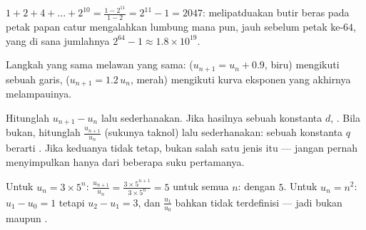 \begin{example}\label{ex:g11:seq:chessboard}
$1 + 2 + 4 + \dots + 2^{10} = \frac{1 - 2^{11}}{1 - 2} = 2^{11} - 1 =
2047$: melipatduakan butir beras pada petak papan catur mengalahkan
lumbung mana pun, jauh sebelum petak ke-$64$, yang di sana jumlahnya
$2^{64} - 1 \approx 1.8 \times 10^{19}$.
\end{example}

\begin{omfigure}

{\small Langkah yang sama melawan  yang sama: 
($u_{n+1} = u_n + 0.9$, biru) mengikuti sebuah garis, 
($u_{n+1} = 1.2\,u_n$, merah) mengikuti kurva eksponen yang akhirnya
melampauinya.}
\end{omfigure}

\begin{method}\label{met:g11:seq:recognize}
Hitunglah $u_{n+1} - u_n$ lalu sederhanakan. Jika hasilnya sebuah konstanta
$d$,  . Bila bukan, hitunglah $\frac{u_{n+1}}{u_n}$
(sukunya taknol) lalu sederhanakan: sebuah konstanta $q$ berarti .
Jika keduanya tidak tetap,  bukan salah satu jenis itu --- jangan
pernah menyimpulkan hanya dari beberapa suku pertamanya.
\end{method}

\begin{example}
Untuk $u_n = 3 \times 5^n$:
$\frac{u_{n+1}}{u_n} = \frac{3 \times 5^{n+1}}{3 \times 5^n} = 5$ untuk semua
$n$:  dengan  $5$. Untuk $u_n = n^2$:
$u_1 - u_0 = 1$ tetapi $u_2 - u_1 = 3$, dan
$\frac{u_1}{u_0}$ bahkan tidak terdefinisi --- jadi bukan  maupun
.
\end{example}

